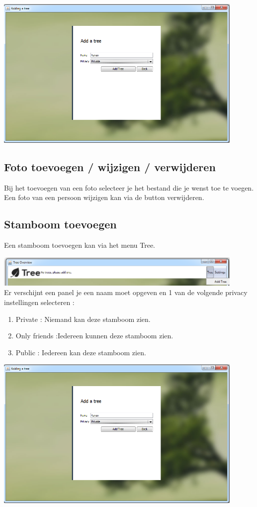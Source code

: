 \documentclass[pdftex,a4paper,12pt,twoside]{report}
\begin{document}
\includegraphics[width=12cm]{images/add_tree.png}\\[.5cm]
\subsection{Foto toevoegen / wijzigen / verwijderen}
Bij het toevoegen van een foto selecteer je het bestand die je wenst toe te voegen.
Een foto van een persoon wijzigen kan via de button verwijderen.

\subsection{Stamboom toevoegen}
Een stamboom toevoegen kan via het menu Tree.

\includegraphics[width=12cm]{images/tree_add.png}\\[.5cm]

Er verschijnt een panel je een naam moet opgeven en 1 van de volgende privacy instellingen selecteren :

\begin{enumerate}
\item \label{it:first}Private : Niemand kan deze stamboom zien.
\item \label{it:first}Only friends :Iedereen kunnen deze stamboom zien.
\item \label{it:first}Public : Iedereen kan deze stamboom zien.
\end{enumerate}

\includegraphics[width=12cm]{images/add_tree.png}\\[.5cm]
\end{document}
